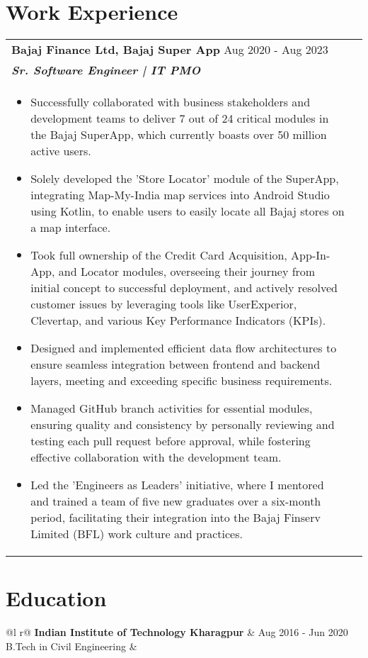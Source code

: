 \documentclass[a4paper,8pt]{article}
\begin{document}
\section{Work Experience}
\begin{tabularx}{\linewidth}{ @{}l r@{} }
\textbf{{Bajaj Finance Ltd, Bajaj Super App}} \hfill \color[HTML]{371e77} Aug 2020 - Aug 2023 \\[4pt]
\color[HTML]{371e77}\textbf{\textit{Sr. Software Engineer | IT PMO}} \color[HTML]{4B28A4} \\[5pt]
\begin{minipage}[t]{\linewidth}
    \begin{itemize}[nosep,after=\strut, leftmargin=2em, itemsep=2pt]
        \item Successfully collaborated with business stakeholders and development teams to deliver 7 out of 24 critical modules in the Bajaj SuperApp, which currently boasts over 50 million active users.
        \item Solely developed the 'Store Locator' module of the SuperApp, integrating Map-My-India map services into Android Studio using Kotlin, to enable users to easily locate all Bajaj stores on a map interface.
        \item Took full ownership of the Credit Card Acquisition, App-In-App, and Locator modules, overseeing their journey from initial concept to successful deployment, and actively resolved customer issues by leveraging tools like UserExperior, Clevertap, and various Key Performance Indicators (KPIs).
        \item Designed and implemented efficient data flow architectures to ensure seamless integration between frontend and backend layers, meeting and exceeding specific business requirements.
        \item Managed GitHub branch activities for essential modules, ensuring quality and consistency by personally reviewing and testing each pull request before approval, while fostering effective collaboration with the development team.
        \item Led the 'Engineers as Leaders' initiative, where I mentored and trained a team of five new graduates over a six-month period, facilitating their integration into the Bajaj Finserv Limited (BFL) work culture and practices.
    \end{itemize}
\end{minipage}
\end{tabularx}

\section{Education}
\begin{tabularx}{\linewidth}{ @{}l r@{} }
\color[HTML]{1C033C} \textbf{Indian Institute of Technology Kharagpur} & \hfill \color[HTML]{371e77} Aug 2016 - Jun 2020 \\
\color[HTML]{371e77} B.Tech in Civil Engineering & \hfill \color[HTML]{4B28A4} \textit{\textbf{}} \\
\end{tabularx}
\end{document}
